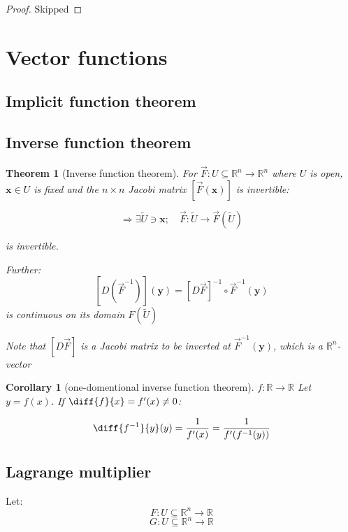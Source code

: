 \documentclass{article}
\theoremstyle{plain}
\newtheorem{theorem}{Theorem}
\newtheorem{corollary}{Corollary}
\begin{document}
\begin{proof}
    Skipped
\end{proof}
\section{Vector functions}

\subsection{Implicit function theorem}



\subsection{Inverse function theorem}

\begin{theorem}[Inverse function theorem]
    For $\vec F: U \subseteq \mathbb R^n \rightarrow \mathbb R^n$
    where $U$ is open, $\mathbf x \in U$ is fixed and the
    $n \times n$ Jacobi matrix $[ \vec F(\mathbf x)]$ is invertible:

    $$\Rightarrow \exists \tilde{U} \ni \mathbf x; \quad \vec F: \tilde U \rightarrow \vec F(\tilde U)$$

    is invertible.

    Further:
    $$[D (\vec F^{-1})](\mathbf y) = [D \vec F]^{-1} \circ \vec F^{-1}(\mathbf y)$$
    is continuous on its domain $F(\tilde U)$

    Note that $[D \vec F]$ is a Jacobi matrix to be inverted at $ \vec F^{-1}(\mathbf y)$, which
    is a $\mathbb R^n$-vector
    
\end{theorem}

\begin{corollary}[one-domentional inverse function theorem]
    $f: \mathbb R \rightarrow \mathbb R$
    Let $y = f(x)$. If $\diff{f}{x} = f'(x) \neq 0$:

    $$\diff{f^{-1}}{y}(y) = \frac{1}{f'(x)} = \frac{1}{f'(f^{-1}(y))}$$
    
\end{corollary}



\subsection{Lagrange multiplier}

Let:
$$F: U \subseteq \mathbb R^n \rightarrow \mathbb R$$
$$G: U \subseteq \mathbb R^n \rightarrow \mathbb R$$
\end{document}
